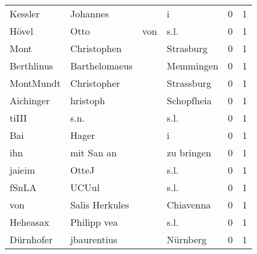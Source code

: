 \documentclass[10pt,a4paper,landscape]{article}
\begin{document}
\begin{longtable}{llllrr}
                  Kessler &                           Johannes &             &                                           i &          0 &         1 \\
                    Hövel &                               Otto &         von &                                        s.l. &          0 &         1 \\
                     Mont &                        Christophen &             &                                   Strasburg &          0 &         1 \\
               Berthlinus &                      Barthelomaeus &             &                                   Memmingen &          0 &         1 \\
                MontMundt &                        Christopher &             &                                  Strassburg &          0 &         1 \\
                Aichinger &                           hristoph &             &                                  Schopfheia &          0 &         1 \\
                    tiIII &                               s.n. &             &                                        s.l. &          0 &         1 \\
                      Bai &                              Hager &             &                                           i &          0 &         1 \\
                      ihn &                         mit San an &             &                                  zu bringen &          0 &         1 \\
                   jaieim &                              OtteJ &             &                                        s.l. &          0 &         1 \\
                    fSnLA &                              UCUul &             &                                        s.l. &          0 &         1 \\
                      von &                     Salis Herkules &             &                                   Chiavenna &          0 &         1 \\
                 Heheasax &                        Philipp vea &             &                                        s.l. &          0 &         1 \\
                Dürnhofer &                        jbaurentius &             &                                    Nürnberg &          0 &         1 \\

\end{longtable}
\end{document}
